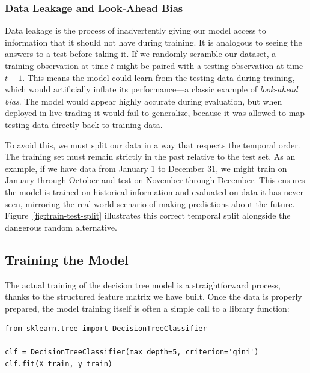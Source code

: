 \subsubsection{Data Leakage and Look-Ahead Bias}

Data leakage is the process of inadvertently giving our model access to information that it should
not have during training.
It is analogous to seeing the answers to a test before taking it.
If we randomly scramble our dataset, a training observation at time $t$ might be paired with a
testing observation at time $t+1$.
This means the model could learn from the testing data during training, which would artificially
inflate its performance---a classic example of \textit{look-ahead bias}.
The model would appear highly accurate during evaluation, but when deployed in live trading it would
fail to generalize, because it was allowed to map testing data directly back to training data.

To avoid this, we must split our data in a way that respects the temporal order.
The training set must remain strictly in the past relative to the test set.
As an example, if we have data from January 1 to December 31, we might train on January through
October and test on November through December.
This ensures the model is trained on historical information and evaluated on data it has never seen,
mirroring the real-world scenario of making predictions about the future.
Figure~\ref{fig:train-test-split} illustrates this correct temporal split alongside the dangerous
random alternative.




\subsection{Training the Model}

The actual training of the decision tree model is a straightforward process, thanks to the
structured feature matrix we have built. Once the data is properly prepared, the model
training itself is often a simple call to a library function:

\begin{listing}[ht]
\begin{verbatim}
from sklearn.tree import DecisionTreeClassifier

clf = DecisionTreeClassifier(max_depth=5, criterion='gini')
clf.fit(X_train, y_train)
\end{verbatim}
\caption{Fitting a decision tree using scikit-learn.}
\label{lst:sklearn-fit}
\end{listing}


